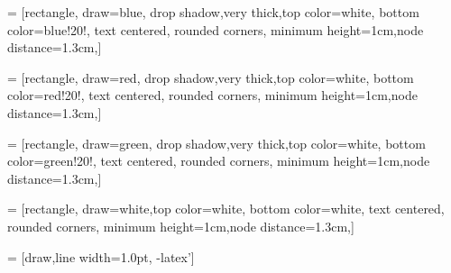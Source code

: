     
 = [rectangle, draw=blue, drop shadow,very thick,top color=white,              %
    bottom color=blue!20!,%
    text centered, rounded corners, minimum height=1cm,node distance=1.3cm,]
 
  =  [rectangle, draw=red, drop shadow,very thick,top color=white,              %
    bottom color=red!20!,%
    text centered, rounded corners, minimum height=1cm,node distance=1.3cm,]

 = [rectangle, draw=green, drop shadow,very thick,top color=white,              %
    bottom color=green!20!,%
		text centered, rounded corners, minimum height=1cm,node distance=1.3cm,]
		
 = [rectangle, draw=white,top color=white,              %
    bottom color=white,%
		text centered, rounded corners, minimum height=1cm,node distance=1.3cm,]

 

 = [draw,line width=1.0pt, -latex']
    

